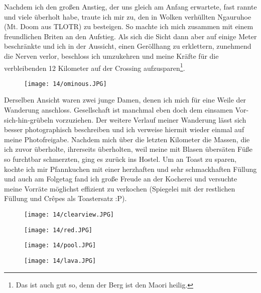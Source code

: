Nachdem ich den großen Anstieg, der uns gleich am Anfang erwartete,
fast rannte und viele überholt habe, traute ich mir zu, den in Wolken
verhüllten Ngauruhoe (Mt. Doom aus TLOTR) zu besteigen. So machte ich
mich zusammen mit einem freundlichen Briten an den Aufstieg.  Als sich
die Sicht dann aber auf einige Meter beschränkte und ich in der
Aussicht, einen Geröllhang zu erklettern, zunehmend die Nerven verlor,
beschloss ich umzukehren und meine Kräfte für die verbleibenden 12
Kilometer auf der Crossing aufzusparen\footnote{Das ist auch gut so,
denn der Berg ist den Maori heilig.}.
\begin{figure}[h]
  \centering
  \texttt{[image: 14/ominous.JPG]}
\end{figure}

Derselben Ansicht waren zwei junge Damen, denen ich mich für eine
Weile der Wanderung anschloss.  Gesellschaft ist manchmal eben doch
dem einsamen Vor-sich-hin-grübeln vorzuziehen. Der weitere Verlauf
meiner Wanderung lässt sich besser photographisch beschreiben und ich
verweise hiermit wieder einmal auf meine Photofreigabe. Nachdem mich
über die letzten Kilometer die Massen, die ich zuvor überholte,
ihrerseits überholten, weil meine mit Blasen übersäten Füße so
furchtbar schmerzten, ging es zurück ins Hostel. Um an Toast zu
sparen, kochte ich mir Pfannkuchen mit einer herzhaften und sehr
schmackhaften Füllung und auch am Folgetag fand ich große Freude an
der Kocherei und versuchte meine Vorräte möglichst effizient zu
verkochen (Spiegelei mit der restlichen Füllung und Crêpes als
Toastersatz :P).
\begin{figure}[h]
  \centering
  \texttt{[image: 14/clearview.JPG]}
\end{figure}
\begin{figure}[h]
  \centering
  \texttt{[image: 14/red.JPG]}
\end{figure}
\begin{figure}[h]
  \centering
  \texttt{[image: 14/pool.JPG]}
\end{figure}
\begin{figure}[h]
  \centering
  \texttt{[image: 14/lava.JPG]}
\end{figure}

